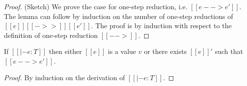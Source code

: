 \begin{proof}
    (Sketch) We prove the case for one-step reduction, i.e. $[[e --> e']]$. The lemma can follow by induction on the number of one-step reductions of $[[e]] [[->>]] [[e']]$.
    The proof is by induction with respect to the definition of one-step reduction $[[-->]]$.
\end{proof}

\begin{lem}[Progress]
If $[[|- e:T]]$ then either $[[e]]$ is a value $v$ or there exists $[[e]]'$ such that $[[e --> e']]$.
\end{lem}

\begin{proof}
    By induction on the derivation of $[[|- e:T]]$.
\end{proof}
